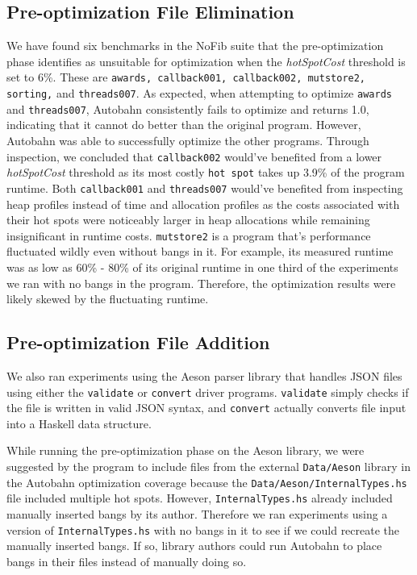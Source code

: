 \documentclass[format=sigplan]{acmart}
\newcommand{\hotspots}[0]{hot spots}
\newcommand{\hotspotcost}[0]{\textit{hotSpotCost}}
\newcommand{\preopt}[0]{pre-optimization}
\newcommand{\Preopt}[0]{Pre-optimization}
\begin{document}
\subsection{\Preopt{} File Elimination}

We have found six benchmarks in the NoFib suite that the \preopt{} phase identifies as unsuitable for optimization when the \hotspotcost{} threshold is set to 6\%. These are \texttt{awards, callback001, callback002, mutstore2, sorting,} and \texttt{threads007}. As expected, when attempting to optimize \texttt{awards} and \texttt{threads007}, Autobahn consistently fails to optimize and returns 1.0, indicating that it cannot do better than the original program. However, Autobahn was able to successfully optimize the other programs. Through inspection, we concluded that \texttt{callback002} would've benefited from a lower \hotspotcost{} threshold as its most costly \texttt{hot spot} takes up 3.9\% of the program runtime. Both \texttt{callback001} and \texttt{threads007} would've benefited from inspecting heap profiles instead of time and allocation profiles as the costs associated with their hot spots were noticeably larger in heap allocations while remaining insignificant in runtime costs. \texttt{mutstore2} is a program that's performance fluctuated wildly even without bangs in it. For example, its measured runtime was as low as 60\% - 80\% of its original runtime in one third of the experiments we ran with no bangs in the program. Therefore, the optimization results were likely skewed by the fluctuating runtime.

\subsection{\Preopt{} File Addition}

We also ran experiments using the Aeson parser library that handles JSON files using either the \texttt{validate} or \texttt{convert} driver programs. \texttt{validate} simply checks if the file is written in valid JSON syntax, and \texttt{convert} actually converts file input into a Haskell data structure. 

While running the \preopt{} phase on the Aeson library, we were suggested by the program to include files from the external \texttt{Data/Aeson} library in the Autobahn optimization coverage because the \texttt{Data/Aeson/InternalTypes.hs} file included multiple \hotspots{}. However, \texttt{InternalTypes.hs} already included manually inserted bangs by its author. Therefore we ran experiments using a version of \texttt{InternalTypes.hs} with no bangs in it to see if we could recreate the manually inserted bangs. If so, library authors could run Autobahn to place bangs in their files instead of manually doing so. 
\end{document}
